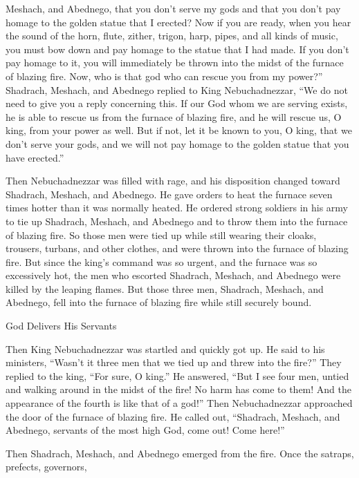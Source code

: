 {Meshach,
and Abednego,
that you don’t
serve
my gods
and that you don’t
pay homage
to the golden
statue
that
I erected?
Now
if
you are
ready,
when
you hear
the sound
of the horn,
flute,
zither,
trigon,
harp,
pipes,
and all
kinds
of music, you must bow down
and pay homage
to the statue
that
I had made.
If
you don’t
pay homage
to it, you will immediately
be thrown into
the midst
of the furnace
of blazing
fire.
Now, who
is
that god
who
can rescue
you from
my power?”
Shadrach,
Meshach,
and Abednego
replied
to King
Nebuchadnezzar, “We
do not
need
to give
you a reply
concerning
this.
If
our God
whom
we
are serving
exists,
he is able
to rescue
us from the furnace
of blazing
fire,
and he will rescue
us, O king,
from
your power as well.
But if
not,
let it be
known
to you, O king,
that
we don’t
serve
your gods,
and we will not
pay homage
to the golden
statue
that
you have erected.”
\par }{\PP {}Then
Nebuchadnezzar
was filled
with rage,
and his disposition
changed
toward
Shadrach,
Meshach,
and Abednego.
He gave orders
to heat
the furnace
seven times
hotter
than
it was normally
heated.
He ordered
strong
soldiers
in his army
to tie up
Shadrach,
Meshach,
and Abednego
and to throw them into
the furnace
of blazing
fire.
So
those
men
were tied up
while still wearing their cloaks,
trousers,
turbans,
and other clothes,
and were thrown
into
the furnace
of blazing
fire.
But
since
the king’s
command
was so urgent,
and the furnace
was so excessively
hot,
the men
who
escorted
Shadrach,
Meshach,
and Abednego
were killed
by the leaping
flames.
But those
three
men,
Shadrach,
Meshach,
and Abednego,
fell
into
the furnace
of blazing
fire
while still securely bound.
\par }{\SH God Delivers His Servants
\par }{\PP {}Then
King
Nebuchadnezzar
was startled
and quickly
got up.
He said
to his ministers,
“Wasn’t
it three
men
that we tied up
and threw
into
the fire?” They replied
to the king,
“For sure,
O king.”
He answered,
“But
I
see
four
men,
untied
and walking around
in the midst
of the fire! No
harm
has come
to them! And the appearance
of the fourth
is like
that of a
god!”
Then
Nebuchadnezzar
approached
the door
of the furnace
of blazing
fire.
He called out, “Shadrach,
Meshach,
and Abednego,
servants
of the most high
God,
come out! Come
here!”
\par }{\PP Then
Shadrach,
Meshach,
and Abednego
emerged
from
the fire.
Once the satraps,
prefects,
governors,
}
